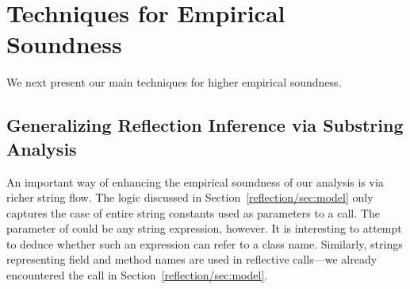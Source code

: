 %
%
%
%



\section{Techniques for Empirical Soundness}
\label{reflection/soundiness}

We next present our main techniques for higher empirical soundness.


\subsection{Generalizing Reflection Inference via Substring Analysis}  
\label{reflection/sec:strings}

An important way of enhancing the empirical soundness of our analysis
is via richer string flow. The logic discussed in
Section~\ref{reflection/sec:model} only captures the case of entire
string constants used as parameters to a  call. The
parameter of  could be any string expression,
however. It is interesting to attempt to deduce whether such an
expression can refer to a class name. Similarly, strings representing
field and method names are used in reflective calls---we already
encountered the  call in
Section~\ref{reflection/sec:model}.

